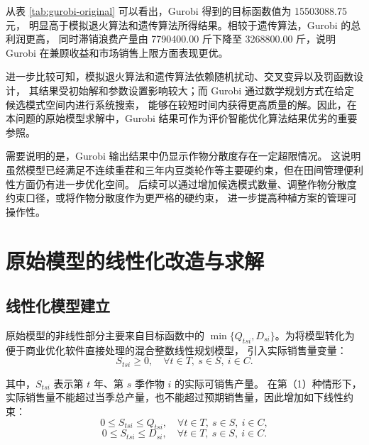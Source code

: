 \documentclass[12pt,a4paper]{ctexart}
\begin{document}
\begin{table}[htbp]
\centering
\caption{Gurobi 对原始模型的计算结果}
\label{tab:gurobi-original}
\small
\setlength{\tabcolsep}{4pt}
\end{table}

从表 \ref{tab:gurobi-original} 可以看出，Gurobi 得到的目标函数值为 15503088.75 元，
明显高于模拟退火算法和遗传算法所得结果。相较于遗传算法，Gurobi 的总利润更高，
同时滞销浪费产量由 7790400.00 斤下降至 3268800.00 斤，说明 Gurobi 在兼顾收益和市场销售上限方面表现更优。

进一步比较可知，模拟退火算法和遗传算法依赖随机扰动、交叉变异以及罚函数设计，
其结果受初始解和参数设置影响较大；而 Gurobi 通过数学规划方式在给定候选模式空间内进行系统搜索，
能够在较短时间内获得更高质量的解。因此，在本问题的原始模型求解中，Gurobi 结果可作为评价智能优化算法结果优劣的重要参照。

需要说明的是，Gurobi 输出结果中仍显示作物分散度存在一定超限情况。
这说明虽然模型已经满足不连续重茬和三年内豆类轮作等主要硬约束，但在田间管理便利性方面仍有进一步优化空间。
后续可以通过增加候选模式数量、调整作物分散度约束口径，或将作物分散度作为更严格的硬约束，
进一步提高种植方案的管理可操作性。

\section{原始模型的线性化改造与求解}

\subsection{线性化模型建立}

原始模型的非线性部分主要来自目标函数中的
$\min\{Q_{tsi},D_{si}\}$。为将模型转化为便于商业优化软件直接处理的混合整数线性规划模型，
引入实际销售量变量：
\[
S_{tsi}\geq 0,
\quad \forall t\in T,\ s\in S,\ i\in C.
\]

其中，$S_{tsi}$ 表示第 $t$ 年、第 $s$ 季作物 $i$ 的实际可销售产量。
在第（1）种情形下，实际销售量不能超过当季总产量，也不能超过预期销售量，因此增加如下线性约束：
\[
0\leq S_{tsi}\leq Q_{tsi},
\quad \forall t\in T,\ s\in S,\ i\in C,
\]
\[
0\leq S_{tsi}\leq D_{si},
\quad \forall t\in T,\ s\in S,\ i\in C.
\]
\end{document}
